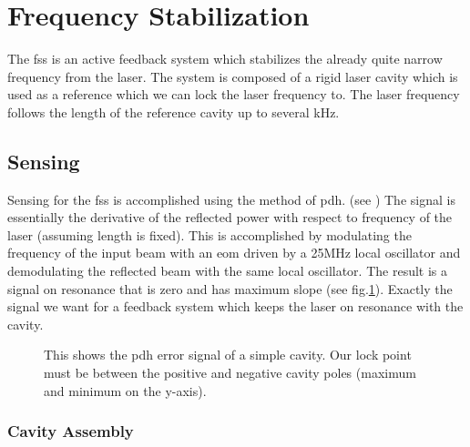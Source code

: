 \section{Frequency Stabilization}
\label{sec:fss}

The \ac{fss} is an active feedback system which stabilizes the already quite
narrow frequency from the laser. The system is composed of a rigid laser cavity
which is used as a reference which we can lock the laser frequency to. The
laser frequency follows the length of the reference cavity up to several kHz.

\subsection{Sensing}

Sensing for the \ac{fss} is accomplished using the method of \ac{pdh}.
(see \cite{Black:2001})
The signal is essentially the derivative of the reflected power with respect
to frequency of the laser (assuming length is fixed).
This is accomplished by modulating the frequency of the input beam with an
\ac{eom} driven by a 25MHz local oscillator and demodulating the reflected
beam with the same local oscillator.
The result is a signal on resonance that is zero and has maximum slope
(see fig.\ref{fig:pdh}).
Exactly the signal we want for a feedback system which keeps the laser on
resonance with the cavity. 

\begin{figure}
\centering
{}
\caption[PDH Error Signal]{This shows the \ac{pdh} error signal of a simple
  cavity.
  Our lock point must be between the positive and negative cavity poles
  (maximum  and minimum on the y-axis).
  }
\label{fig:pdh}
\end{figure}

\subsubsection{Cavity Assembly}

